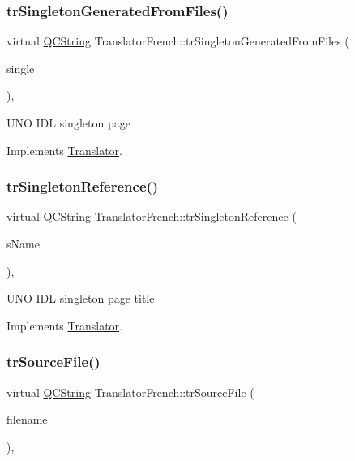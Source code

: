 \subsubsection{\texorpdfstring{trSingletonGeneratedFromFiles()}{trSingletonGeneratedFromFiles()}}
{\footnotesize\ttfamily virtual \mbox{\hyperlink{class_q_c_string}{Q\+C\+String}} Translator\+French\+::tr\+Singleton\+Generated\+From\+Files (\begin{DoxyParamCaption}\item[{bool}]{single }\end{DoxyParamCaption})\hspace{0.3cm}{\ttfamily [inline]}, {\ttfamily [virtual]}}

U\+NO I\+DL singleton page 

Implements \mbox{\hyperlink{class_translator}{Translator}}.

\mbox{\label{class_translator_french_ae907e87a534e08bd06a29acc078ab433}} 
\subsubsection{\texorpdfstring{trSingletonReference()}{trSingletonReference()}}
{\footnotesize\ttfamily virtual \mbox{\hyperlink{class_q_c_string}{Q\+C\+String}} Translator\+French\+::tr\+Singleton\+Reference (\begin{DoxyParamCaption}\item[{const char $\ast$}]{s\+Name }\end{DoxyParamCaption})\hspace{0.3cm}{\ttfamily [inline]}, {\ttfamily [virtual]}}

U\+NO I\+DL singleton page title 

Implements \mbox{\hyperlink{class_translator}{Translator}}.

\mbox{\label{class_translator_french_a0ba2f49b69ac39c84578dc203a52e3b8}} 
\subsubsection{\texorpdfstring{trSourceFile()}{trSourceFile()}}
{\footnotesize\ttfamily virtual \mbox{\hyperlink{class_q_c_string}{Q\+C\+String}} Translator\+French\+::tr\+Source\+File (\begin{DoxyParamCaption}\item[{\mbox{\hyperlink{class_q_c_string}{Q\+C\+String}} \&}]{filename }\end{DoxyParamCaption})\hspace{0.3cm}{\ttfamily [inline]}, {\ttfamily [virtual]}}

